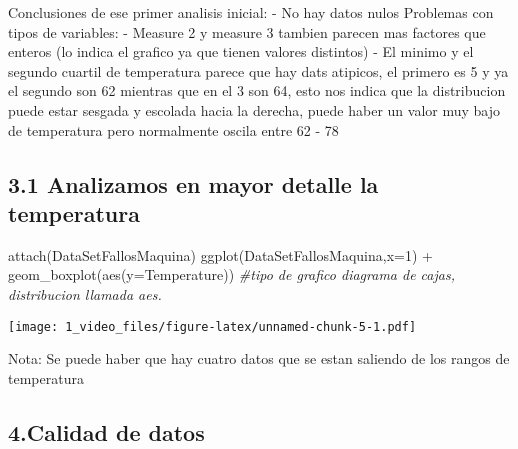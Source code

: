 \documentclass[
]{article}
\newenvironment{Shaded}{\begin{snugshade}}{\end{snugshade}}
\newcommand{\AttributeTok}[1]{\textcolor[rgb]{0.77,0.63,0.00}{#1}}
\newcommand{\CommentTok}[1]{\textcolor[rgb]{0.56,0.35,0.01}{\textit{#1}}}
\newcommand{\DecValTok}[1]{\textcolor[rgb]{0.00,0.00,0.81}{#1}}
\newcommand{\FunctionTok}[1]{\textcolor[rgb]{0.00,0.00,0.00}{#1}}
\newcommand{\NormalTok}[1]{#1}
\newcommand{\SpecialCharTok}[1]{\textcolor[rgb]{0.00,0.00,0.00}{#1}}
\begin{document}
Conclusiones de ese primer analisis inicial: - No hay datos nulos
Problemas con tipos de variables: - Measure 2 y measure 3 tambien
parecen mas factores que enteros (lo indica el grafico ya que tienen
valores distintos) - El minimo y el segundo cuartil de temperatura
parece que hay dats atipicos, el primero es 5 y ya el segundo son 62
mientras que en el 3 son 64, esto nos indica que la distribucion puede
estar sesgada y escolada hacia la derecha, puede haber un valor muy bajo
de temperatura pero normalmente oscila entre 62 - 78

\hypertarget{analizamos-en-mayor-detalle-la-temperatura}{%
\subsection{3.1 Analizamos en mayor detalle la
temperatura}\label{analizamos-en-mayor-detalle-la-temperatura}}

\begin{Shaded}
\begin{Highlighting}[]
\FunctionTok{attach}\NormalTok{(DataSetFallosMaquina)}
\FunctionTok{ggplot}\NormalTok{(DataSetFallosMaquina,}\AttributeTok{x=}\DecValTok{1}\NormalTok{) }\SpecialCharTok{+} \FunctionTok{geom\_boxplot}\NormalTok{(}\FunctionTok{aes}\NormalTok{(}\AttributeTok{y=}\NormalTok{Temperature)) }\CommentTok{\#tipo de grafico diagrama de cajas, distribucion llamada aes.}
\end{Highlighting}
\end{Shaded}

\texttt{[image: 1\_video\_files/figure-latex/unnamed-chunk-5-1.pdf]}

Nota: Se puede haber que hay cuatro datos que se estan saliendo de los
rangos de temperatura

\hypertarget{calidad-de-datos}{%
\subsection{4.Calidad de datos}\label{calidad-de-datos}}
\end{document}
